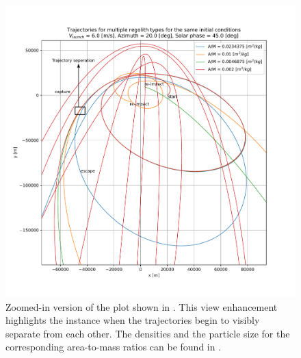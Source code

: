 \FloatBarrier
\begin{figure}[htb]
\centering
\captionsetup{justification=centering}
\includegraphics[width=\textwidth, height=0.4\textheight, keepaspectratio=true]{longest_edge_perturbations/multiple_regolith_types/2d_traj_6ms_20Azim_45SolarPhase_zoomed_edit.pdf}
\caption{Zoomed-in version of the plot shown in . This view enhancement highlights the instance when the trajectories begin to visibly separate from each other. The densities and the particle size for the corresponding area-to-mass ratios can be found in .}
\label{fig:allRegolith_traj_6ms_20Azim_45solarPhase_zoomed}
\end{figure}
\FloatBarrier
